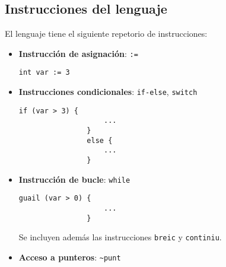 \documentclass[10pt,a4paper]{article}
\begin{document}
\subsection{Instrucciones del lenguaje}
El lenguaje tiene el siguiente repetorio de instrucciones:
\begin{itemize}
    \item \textbf{Instrucción de asignación}: \texttt{:=}
    \begin{center}
        \begin{minipage}{\linewidth}
            \begin{lstlisting}[linewidth=0.3\linewidth, gobble=16]
                int var := 3
            \end{lstlisting}
        \end{minipage}
    \end{center}
    
    \item \textbf{Instrucciones condicionales}: \texttt{if-else}, \texttt{switch}
    \begin{center}
        \begin{minipage}{\linewidth}
            \begin{lstlisting}[linewidth=0.3\linewidth, gobble=16]
                if (var > 3) {
                    ...
                }
                else {
                    ...
                }
            \end{lstlisting}
        \end{minipage}
    \end{center}

    \item \textbf{Instrucción de bucle}: \texttt{while}
    \begin{center}
        \begin{minipage}{\linewidth}
            \begin{lstlisting}[linewidth=0.3\linewidth, gobble=16]
                guail (var > 0) {
                    ...
                }
            \end{lstlisting}
        \end{minipage}
    \end{center}
    Se incluyen además las instrucciones \texttt{breic} y \texttt{continiu}.
    \item \textbf{Acceso a punteros}: \texttt{\~{}punt}
\end{itemize}
\end{document}
